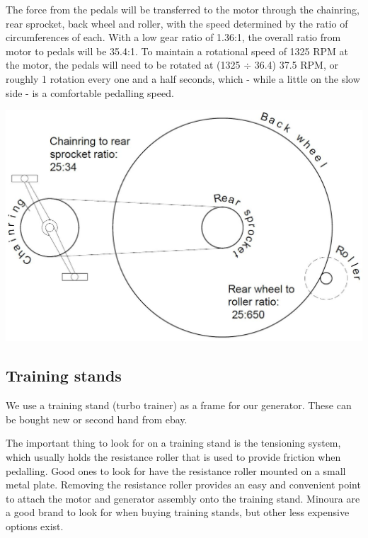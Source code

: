 \documentclass{article}
\theoremstyle{definition}
\theoremstyle{definition}
\theoremstyle{remark}
\begin{document}
    The force from the pedals will be transferred to the motor through the chainring, rear sprocket, back wheel and roller, with the speed determined by the ratio of circumferences of each. With a low gear ratio of 1.36:1, the overall ratio from motor to pedals will be 35.4:1. To maintain a rotational speed of 1325 RPM at the motor, the pedals will need to be rotated at (1325 $\div$ 36.4) 37.5 RPM, or roughly 1 rotation every one and a half seconds, which - while a little on the slow side - is a comfortable pedalling speed.

    \begin{center}
      \includegraphics[width=0.35\paperwidth]{Images/image_3_1_(pedalling_speed).png}
    \end{center}
  

  {\color{blue}\subsection{Training stands}} %
  \label{sub:training_stands}

    We use a training stand (turbo trainer) as a frame for our generator. These can be bought new or second hand from ebay.

    The important thing to look for on a training stand is the tensioning system, which usually holds the resistance roller that is used to provide friction when pedalling. Good ones to look for have the resistance roller mounted on a small metal plate. Removing the resistance roller provides an easy and convenient point to attach the motor and generator assembly onto the training stand. Minoura are a good brand to look for when buying training stands, but other less expensive options exist.
\end{document}
